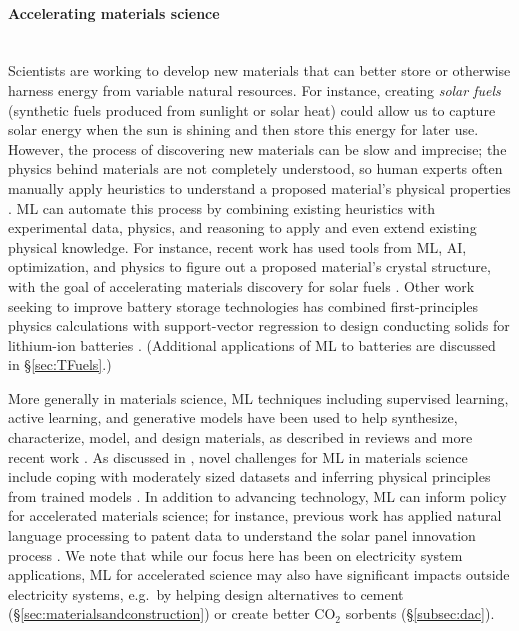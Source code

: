 \documentclass[11pt]{report}
\newcommand{\Gap}{\texorpdfstring{\hfill}{}}
\newcommand{\Rec}{\texorpdfstring{{\small\emph{\color{blue}{\fbox{High Leverage}}}}}{}}
\newcommand{\Longterm}{\texorpdfstring{{\small\emph{\color{OliveGreen}{\fbox{Long-term}}}}}{}}
\begin{document}
\paragraph{Accelerating materials science}\Gap\textbf{\Rec\Longterm}\mbox{}\\\label{sec:electricity-materials}Scientists are working to develop new materials that can better store or otherwise harness energy from variable natural resources. For instance, creating \emph{solar fuels} (synthetic fuels produced from sunlight or solar heat) could allow us to capture solar energy when the sun is shining and then store this energy for later use. However, the process of discovering new materials can be slow and imprecise; the physics behind materials are not completely understood, so human experts often manually apply heuristics to understand a proposed material's physical properties \cite{butler2018machine, bai2018phase}.
ML can automate this process by combining existing heuristics with experimental data, physics, and reasoning to apply and even extend existing physical knowledge. For instance, recent work has used tools from ML, AI, optimization, and physics to figure out a proposed material's crystal structure, with the goal of accelerating materials discovery for solar fuels \cite{gomes2019crystal,bai2018phase,suram2016automated}. Other work seeking to improve battery storage technologies has combined first-principles physics calculations with support-vector regression to design conducting solids for lithium-ion batteries \cite{fujimura2013accelerated}. (Additional applications of ML to batteries are discussed in \S\ref{sec:TFuels}.)

More generally in materials science, ML techniques including supervised learning, active learning, and generative models have been used to help synthesize, characterize, model, and design materials, as described in reviews \cite{butler2018machine, liu2017materials} and more recent work \cite{gomez2018automatic}. As discussed in \cite{butler2018machine}, novel challenges for ML in materials science include coping with moderately sized datasets and inferring physical principles from trained models \cite{umehara2019analyzing}. In addition to advancing technology, ML can inform policy for accelerated materials science; for instance, previous work has applied natural language processing to patent data to understand the solar panel innovation process \cite{venugopalan2015topic}. We note that while our focus here has been on electricity system applications, ML for accelerated science may also have significant impacts outside electricity systems, e.g.~by helping design alternatives to cement (\S\ref{sec:materialsandconstruction}) or create better CO$_2$ sorbents (\S\ref{subsec:dac}).
\end{document}
